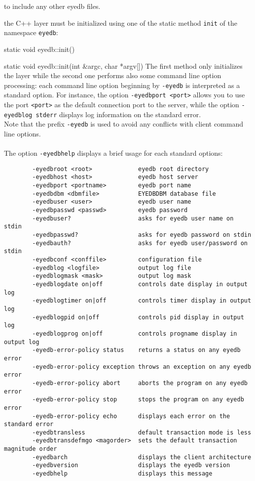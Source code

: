 to include any other eyedb files.
\item the \eyedb C++ layer must be initialized using one of the static method
\texttt{init} of the namespace \texttt{eyedb}:
\be
\item static void eyedb::init()
\item static void eyedb::init(int \&argc, char *argv[])
\ee
The first method only initializes the \eyedb layer while the second
one performs also some command line option processing: each command line option
beginning by \texttt{-eyedb} is interpreted as a standard \eyedb option.
For instance, the option \texttt{-eyedbport <port>} allows you to use
the port \texttt{<port>} as the default connection port to the \eyedb
server, while the option \texttt{-eyedblog stderr} displays log information
on the standard error.
\\
Note that the prefix \texttt{-eyedb} is used to avoid any conflicts
with client command line options.
\\
\\
The option \texttt{-eyedbhelp} displays a brief usage for each standard options:
\verbsize
\begin{verbatim}
        -eyedbroot <root>             eyedb root directory
        -eyedbhost <host>             eyedb host server
        -eyedbport <portname>         eyedb port name
        -eyedbdbm <dbmfile>           EYEDBDBM database file
        -eyedbuser <user>             eyedb user name
        -eyedbpasswd <passwd>         eyedb password
        -eyedbuser?                   asks for eyedb user name on stdin
        -eyedbpasswd?                 asks for eyedb password on stdin
        -eyedbauth?                   asks for eyedb user/password on stdin
        -eyedbconf <conffile>         configuration file
        -eyedblog <logfile>           output log file
        -eyedblogmask <mask>          output log mask
        -eyedblogdate on|off          controls date display in output log
        -eyedblogtimer on|off         controls timer display in output log
        -eyedblogpid on|off           controls pid display in output log
        -eyedblogprog on|off          controls progname display in output log
        -eyedb-error-policy status    returns a status on any eyedb error
        -eyedb-error-policy exception throws an exception on any eyedb error
        -eyedb-error-policy abort     aborts the program on any eyedb error
        -eyedb-error-policy stop      stops the program on any eyedb error
        -eyedb-error-policy echo      displays each error on the standard error
        -eyedbtransless               default transaction mode is less
        -eyedbtransdefmgo <magorder>  sets the default transaction magnitude order
        -eyedbarch                    displays the client architecture
        -eyedbversion                 displays the eyedb version
        -eyedbhelp                    displays this message
\end{verbatim}
